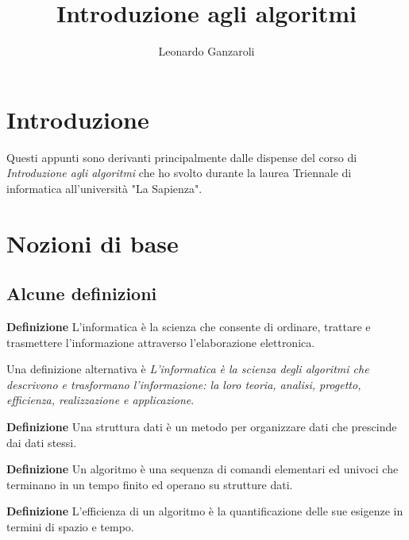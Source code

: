 \documentclass{article}
\title{Introduzione agli algoritmi}
\author{Leonardo Ganzaroli}
\date{}
\begin{document}
\maketitle


\tableofcontents

\newpage

\hypersetup{allcolors=black}

\section*{Introduzione}

Questi appunti sono derivanti principalmente dalle dispense del corso di \textit{Introduzione agli algoritmi} che ho svolto durante la laurea Triennale di informatica all'università "La Sapienza".

\newpage

\section{Nozioni di base}

\subsection{Alcune definizioni}

\textbf{Definizione} L'informatica è la scienza che consente di ordinare, trattare e trasmettere l’informazione attraverso l’elaborazione elettronica.\newline

\noindent Una definizione alternativa è \textit{L’informatica è la scienza degli algoritmi che descrivono e trasformano l’informazione: la loro teoria, analisi,
progetto, efficienza, realizzazione e applicazione}.\newline

\noindent \textbf{Definizione} Una struttura dati è un metodo per organizzare dati che prescinde dai dati stessi.\newline

\noindent\textbf{Definizione} Un algoritmo è una sequenza di comandi elementari ed
univoci che terminano in un tempo finito ed operano su
strutture dati.\newline

\noindent \textbf{Definizione} L'efficienza di un algoritmo è la quantificazione delle sue esigenze in termini di spazio e tempo.\newline
\end{document}
